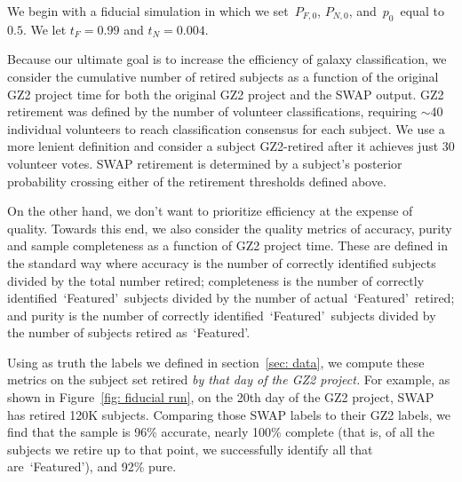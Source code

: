 \documentclass[twocolumn]{aastex6}
\newcommand{\Pf}{$P_{F,0}$}
\newcommand{\Pn}{$P_{N,0}$}
\newcommand{\p}{$p_0$}
\newcommand{\feat}{`Featured'}
\begin{document}
We begin with a fiducial simulation in which we set~\Pf, \Pn, and~\p~equal to $0.5$.
We let $t_F = 0.99$ and $t_N = 0.004$. 

Because our ultimate goal is to increase the efficiency of galaxy classification,
we consider the cumulative number of retired subjects
as a function of the original GZ2 project time for both the original GZ2 project
and the SWAP output. 
GZ2 retirement was defined by the number of volunteer classifications, requiring
$\sim$40 individual volunteers to reach classification consensus for each subject. 
We use a more lenient definition and consider a subject GZ2-retired after it achieves 
just 30 volunteer votes. SWAP retirement is determined by a subject's posterior 
probability crossing either of the retirement thresholds defined above. 

On the other hand, we don't want to prioritize efficiency at the expense of quality. 
Towards this end, we also consider the quality metrics of accuracy, 
purity and sample completeness as a function of GZ2 project time.  These are 
defined in the standard way where accuracy is the number of correctly
identified subjects divided by the total number retired; completeness is the number of 
correctly identified~\feat~subjects divided by the number of actual~\feat~retired; 
and purity is the number of correctly identified~\feat~subjects divided by 
the number of subjects retired as~\feat. 

Using as truth the labels we defined in section~\ref{sec: data}, we compute
these metrics on the subject set retired \textit{by that day of the GZ2 project.} 
For example, as shown in Figure~\ref{fig: fiducial run}, 
on the 20th day of the GZ2 project, 
SWAP has retired 120K subjects. Comparing those SWAP labels to their GZ2 labels, 
we find that the sample is 96\% accurate, nearly 100\% complete (that is, of all
the subjects we retire up to that point, we successfully identify all that are~\feat),
and 92\% pure. 
\end{document}
